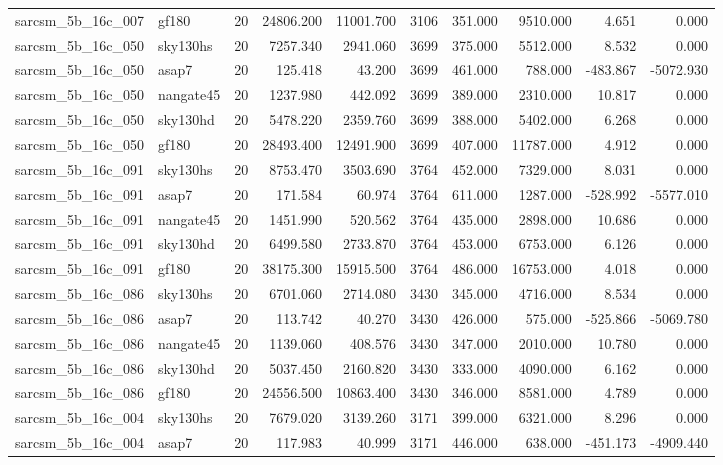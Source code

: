 \begin{longtable}{llrrrrrrrr}
sarcsm\_5b\_16c\_007 & gf180 & 20 & 24806.200 & 11001.700 & 3106 & 351.000 & 9510.000 & 4.651 & 0.000 \\
sarcsm\_5b\_16c\_050 & sky130hs & 20 & 7257.340 & 2941.060 & 3699 & 375.000 & 5512.000 & 8.532 & 0.000 \\
sarcsm\_5b\_16c\_050 & asap7 & 20 & 125.418 & 43.200 & 3699 & 461.000 & 788.000 & -483.867 & -5072.930 \\
sarcsm\_5b\_16c\_050 & nangate45 & 20 & 1237.980 & 442.092 & 3699 & 389.000 & 2310.000 & 10.817 & 0.000 \\
sarcsm\_5b\_16c\_050 & sky130hd & 20 & 5478.220 & 2359.760 & 3699 & 388.000 & 5402.000 & 6.268 & 0.000 \\
sarcsm\_5b\_16c\_050 & gf180 & 20 & 28493.400 & 12491.900 & 3699 & 407.000 & 11787.000 & 4.912 & 0.000 \\
sarcsm\_5b\_16c\_091 & sky130hs & 20 & 8753.470 & 3503.690 & 3764 & 452.000 & 7329.000 & 8.031 & 0.000 \\
sarcsm\_5b\_16c\_091 & asap7 & 20 & 171.584 & 60.974 & 3764 & 611.000 & 1287.000 & -528.992 & -5577.010 \\
sarcsm\_5b\_16c\_091 & nangate45 & 20 & 1451.990 & 520.562 & 3764 & 435.000 & 2898.000 & 10.686 & 0.000 \\
sarcsm\_5b\_16c\_091 & sky130hd & 20 & 6499.580 & 2733.870 & 3764 & 453.000 & 6753.000 & 6.126 & 0.000 \\
sarcsm\_5b\_16c\_091 & gf180 & 20 & 38175.300 & 15915.500 & 3764 & 486.000 & 16753.000 & 4.018 & 0.000 \\
sarcsm\_5b\_16c\_086 & sky130hs & 20 & 6701.060 & 2714.080 & 3430 & 345.000 & 4716.000 & 8.534 & 0.000 \\
sarcsm\_5b\_16c\_086 & asap7 & 20 & 113.742 & 40.270 & 3430 & 426.000 & 575.000 & -525.866 & -5069.780 \\
sarcsm\_5b\_16c\_086 & nangate45 & 20 & 1139.060 & 408.576 & 3430 & 347.000 & 2010.000 & 10.780 & 0.000 \\
sarcsm\_5b\_16c\_086 & sky130hd & 20 & 5037.450 & 2160.820 & 3430 & 333.000 & 4090.000 & 6.162 & 0.000 \\
sarcsm\_5b\_16c\_086 & gf180 & 20 & 24556.500 & 10863.400 & 3430 & 346.000 & 8581.000 & 4.789 & 0.000 \\
sarcsm\_5b\_16c\_004 & sky130hs & 20 & 7679.020 & 3139.260 & 3171 & 399.000 & 6321.000 & 8.296 & 0.000 \\
sarcsm\_5b\_16c\_004 & asap7 & 20 & 117.983 & 40.999 & 3171 & 446.000 & 638.000 & -451.173 & -4909.440 \\

\end{longtable}
